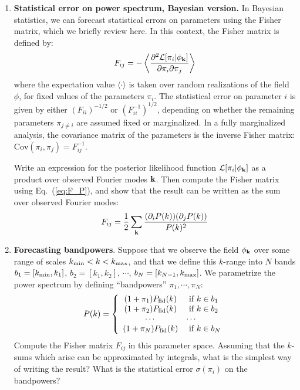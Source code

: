 \documentclass[aps,prd,superscriptaddress,groupedaddress,nofootinbib,nobibnotes]{revtex4}
\newcommand{\be}{\begin{equation}}
\newcommand{\ee}{\end{equation}}
\def\k{{\bf k}}
\def\L{{\mathcal L}}
\begin{document}
\begin{enumerate}
\setcounter{enumi}{\value{enumi_save}}

\item {\bf Statistical error on power spectrum, Bayesian version.}
  In Bayesian statistics, we can forecast statistical errors on parameters using the Fisher matrix,
  which we briefly review here.  In this context, the Fisher matrix is defined by:
\be
F_{ij} = -\left\langle \frac{\partial^2\L[\pi_i|\phi_{\k}]}{\partial\pi_i \partial\pi_j} \right\rangle  \label{eq:F_P}
\ee
  where the expectation value $\langle \cdot \rangle$ is taken over random realizations of the field $\phi$,
  for fixed values of the parameters $\pi_i$.
  The statistical error on parameter $i$ is given by either $(F_{ii})^{-1/2}$ or $(F^{-1}_{ii})^{1/2}$,
  depending on whether the remaining parameters $\pi_{j\ne i}$ are assumed fixed or marginalized.  In a
  fully marginalized analysis, the covariance matrix of the parameters is the inverse Fisher matrix:
  $\mbox{Cov}(\pi_i, \pi_j) = F^{-1}_{ij}$.

  Write an expression for the posterior likelihood function $\L[\pi_i|\phi_{\k}]$ as a product over observed Fourier modes $\k$.
  Then compute the Fisher matrix using Eq.~(\ref{eq:F_P}), and show that the result can be written as the sum over observed Fourier modes:
\be
F_{ij} = \frac{1}{2} \sum_{\k} \frac{(\partial_i P(k)) (\partial_j P(k))}{P(k)^2}
\ee
\item {\bf Forecasting bandpowers}.
  Suppose that we observe the field $\phi_{\k}$ over some range of scales $k_{\rm min} < k < k_{\rm max}$,
  and that we define this $k$-range into $N$ bands $b_1 = [k_{\rm min}, k_1]$, $b_2 = [k_1, k_2]$, $\cdots$, 
  $b_N = [k_{N-1}, k_{\rm max}]$.  We parametrize the power spectrum by defining ``bandpowers'' $\pi_1, \cdots, \pi_N$:
\be
 P(k) = \left\{
  \begin{array}{cl}
    (1 + \pi_1) P_{\rm fid}(k) & \mbox{ if $k\in b_1$} \\
    (1 + \pi_2) P_{\rm fid}(k) & \mbox{ if $k\in b_2$} \\
      \cdots & \cdots \\
    (1 + \pi_N) P_{\rm fid}(k) & \mbox{ if $k\in b_N$}
  \end{array} \right.
\ee
  Compute the Fisher matrix $F_{ij}$ in this parameter space.
  Assuming that the $k$-sums which arise can be approximated by integrals, what is the simplest way of writing the result?
  What is the statistical error $\sigma(\pi_i)$ on the bandpowers?


\end{enumerate}
\end{document}
